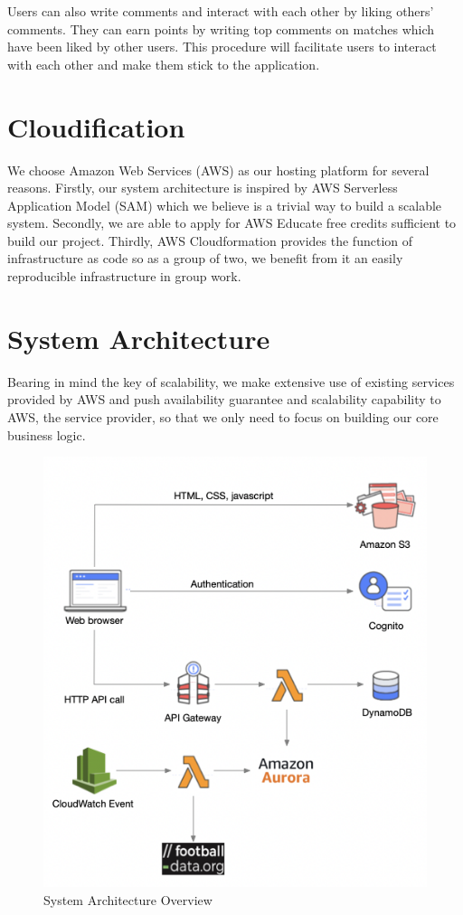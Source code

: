 \documentclass[conference]{IEEEtran}
\begin{document}
Users can also write comments and interact with each other
by liking others’ comments. They can earn points
by writing top comments on matches which have been liked
by other users. This procedure will facilitate users to interact
with each other and make them stick to the application.

\section{Cloudification}
We choose Amazon Web Services (AWS) \cite{AWS} as our hosting platform for several reasons. Firstly, our system architecture is inspired by AWS Serverless Application Model (SAM) \cite{SAM} which we believe is a trivial way to build a scalable system. Secondly, we are able to apply for AWS Educate free credits sufficient to build our project. Thirdly, AWS Cloudformation \cite{cloudformation} provides the function of infrastructure as code so as a group of two, we benefit from it an easily reproducible infrastructure in group work.

\section{System Architecture}
Bearing in mind the key of scalability, we make extensive use of existing services provided by AWS and push availability guarantee and scalability capability to AWS, the service provider, so that we only need to focus on building our core business logic.

\begin{figure}[htbp]
\centerline{\includegraphics{architecture.png}}
\caption{System Architecture Overview}
\label{architecture}
\end{figure}
\end{document}
